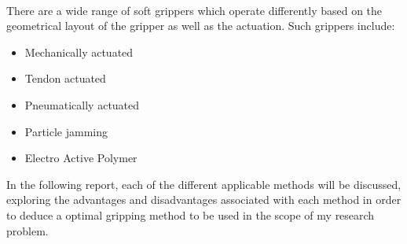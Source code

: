 \documentclass[11pt,twocolumn]{article}
\begin{document}
\\
\newline
There are a wide range of soft grippers which operate differently based on the geometrical layout of the gripper as well as the actuation. Such grippers include:
\begin{itemize}
\item Mechanically actuated
\item Tendon actuated
\item Pneumatically actuated
\item Particle jamming
\item Electro Active Polymer  
\end{itemize}
In the following report, each of the different applicable methods will be discussed, exploring the advantages and disadvantages associated with each method in order to deduce a optimal gripping method to be used in the scope of my research problem.
\end{document}
